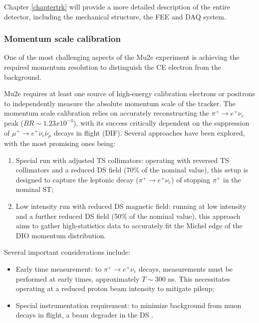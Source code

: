 Chapter \ref{chaptertrk} will provide a more detailed description of the entire detector, 
including the mechanical structure, the FEE and 
DAQ system.
\subsubsection{Momentum scale calibration}
One of the most challenging aspects of the Mu2e experiment is achieving the 
required momentum resolution to distinguish the CE electron from the background.

Mu2e requires at least one source of high-energy calibration electrons or 
positrons to independently measure the absolute momentum scale of the tracker. 
The momentum scale calibration relies on accurately reconstructing the 
$\pi^+ \rightarrow e^+ \nu_e$ peak ($BR\sim 1.23x10^{-4}$), with its success critically dependent on the 
suppression of $\mu^+ \rightarrow e^+ \nu_e \bar{\nu}_\mu$ decays in flight (DIF). 
Several approaches have been explored, with the most promising ones being:

\begin{enumerate}
    \item Special run with adjusted TS collimators: operating with 
    reversed TS collimators and a reduced DS field 
    (70\% of the nominal value), this setup is designed to capture the 
    leptonic decay ($\pi^+ \rightarrow e^+ \nu_e$) of stopping $\pi^+$ in the nominal ST;
    
    \item Low intensity run with reduced DS magnetic field: 
    running at low intensity and a further reduced DS field 
    (50\% of the nominal value), 
    this approach aims to gather high-statistics data to accurately fit 
    the Michel edge of the DIO momentum distribution.
\end{enumerate}

Several important considerations include:

\begin{itemize}
    \item Early time measurement: to  $\pi^+ \rightarrow e^+ \nu_e$ decays, 
    measurements must be performed at early times, approximately 
    $T \sim 300$ ns. This necessitates operating at a reduced proton 
    beam intensity to mitigate  pileup;
    
    \item Special instrumentation requirement: to minimize 
       background from muon decays in flight,
       a beam degrader
      in the DS .
\end{itemize}

